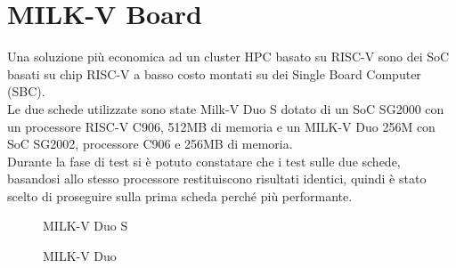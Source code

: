 \section*{MILK-V Board}
Una soluzione più economica ad un cluster HPC basato su RISC-V sono dei SoC basati su chip RISC-V a basso costo montati su dei Single Board Computer (SBC).\\ 
Le due schede utilizzate sono state Milk-V Duo S dotato di un SoC SG2000 con un processore RISC-V C906, 512MB di memoria e un MILK-V Duo 256M con SoC SG2002, processore C906 e 256MB di memoria.\\
Durante la fase di test si è potuto constatare che i test sulle due schede, basandosi allo stesso processore restituiscono risultati identici, quindi è stato scelto di proseguire sulla prima scheda perché più performante.
\newpage
\FloatBarrier
\begin{figure}%
    \centering
    \qquad
    \caption{MILK-V Duo S}%
\end{figure}
\begin{figure}%
    \centering
    \qquad
    \caption{MILK-V Duo}%
\end{figure}

